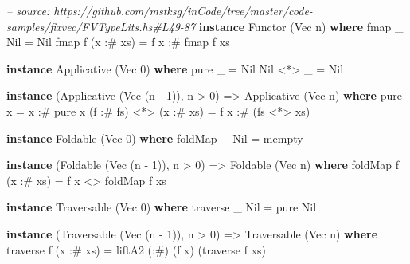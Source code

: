 \documentclass[]{article}
\newenvironment{Shaded}{}{}
\newcommand{\KeywordTok}[1]{\textcolor[rgb]{0.00,0.44,0.13}{\textbf{#1}}}
\newcommand{\DataTypeTok}[1]{\textcolor[rgb]{0.56,0.13,0.00}{#1}}
\newcommand{\DecValTok}[1]{\textcolor[rgb]{0.25,0.63,0.44}{#1}}
\newcommand{\CommentTok}[1]{\textcolor[rgb]{0.38,0.63,0.69}{\textit{#1}}}
\newcommand{\OtherTok}[1]{\textcolor[rgb]{0.00,0.44,0.13}{#1}}
\newcommand{\FunctionTok}[1]{\textcolor[rgb]{0.02,0.16,0.49}{#1}}
\newcommand{\NormalTok}[1]{#1}
\begin{document}
\begin{Shaded}
\begin{Highlighting}[]
\CommentTok{-- source: https://github.com/mstksg/inCode/tree/master/code-samples/fixvec/FVTypeLits.hs#L49-87}
\KeywordTok{instance} \DataTypeTok{Functor}\NormalTok{ (}\DataTypeTok{Vec}\NormalTok{ n) }\KeywordTok{where}
\NormalTok{    fmap _ }\DataTypeTok{Nil}       \FunctionTok{=} \DataTypeTok{Nil}
\NormalTok{    fmap f (x }\FunctionTok{:#}\NormalTok{ xs) }\FunctionTok{=}\NormalTok{ f x }\FunctionTok{:#}\NormalTok{ fmap f xs}

\KeywordTok{instance} \DataTypeTok{Applicative}\NormalTok{ (}\DataTypeTok{Vec} \DecValTok{0}\NormalTok{) }\KeywordTok{where}
\NormalTok{    pure _    }\FunctionTok{=} \DataTypeTok{Nil}
    \DataTypeTok{Nil} \FunctionTok{<*>}\NormalTok{ _ }\FunctionTok{=} \DataTypeTok{Nil}

\KeywordTok{instance}\NormalTok{ (}\DataTypeTok{Applicative}\NormalTok{ (}\DataTypeTok{Vec}\NormalTok{ (n }\FunctionTok{-} \DecValTok{1}\NormalTok{)), n }\FunctionTok{>} \DecValTok{0}\NormalTok{) }\OtherTok{=>} \DataTypeTok{Applicative}\NormalTok{ (}\DataTypeTok{Vec}\NormalTok{ n) }\KeywordTok{where}
\NormalTok{    pure x }\FunctionTok{=}\NormalTok{ x }\FunctionTok{:#}\NormalTok{ pure x}
\NormalTok{    (f }\FunctionTok{:#}\NormalTok{ fs) }\FunctionTok{<*>}\NormalTok{ (x }\FunctionTok{:#}\NormalTok{ xs) }\FunctionTok{=}\NormalTok{ f x }\FunctionTok{:#}\NormalTok{ (fs }\FunctionTok{<*>}\NormalTok{ xs)}

\KeywordTok{instance} \DataTypeTok{Foldable}\NormalTok{ (}\DataTypeTok{Vec} \DecValTok{0}\NormalTok{) }\KeywordTok{where}
\NormalTok{    foldMap _ }\DataTypeTok{Nil} \FunctionTok{=}\NormalTok{ mempty}

\KeywordTok{instance}\NormalTok{ (}\DataTypeTok{Foldable}\NormalTok{ (}\DataTypeTok{Vec}\NormalTok{ (n }\FunctionTok{-} \DecValTok{1}\NormalTok{)), n }\FunctionTok{>} \DecValTok{0}\NormalTok{) }\OtherTok{=>} \DataTypeTok{Foldable}\NormalTok{ (}\DataTypeTok{Vec}\NormalTok{ n) }\KeywordTok{where}
\NormalTok{    foldMap f (x }\FunctionTok{:#}\NormalTok{ xs) }\FunctionTok{=}\NormalTok{ f x }\FunctionTok{<>}\NormalTok{ foldMap f xs}

\KeywordTok{instance} \DataTypeTok{Traversable}\NormalTok{ (}\DataTypeTok{Vec} \DecValTok{0}\NormalTok{) }\KeywordTok{where}
\NormalTok{    traverse _ }\DataTypeTok{Nil} \FunctionTok{=}\NormalTok{ pure }\DataTypeTok{Nil}

\KeywordTok{instance}\NormalTok{ (}\DataTypeTok{Traversable}\NormalTok{ (}\DataTypeTok{Vec}\NormalTok{ (n }\FunctionTok{-} \DecValTok{1}\NormalTok{)), n }\FunctionTok{>} \DecValTok{0}\NormalTok{) }\OtherTok{=>} \DataTypeTok{Traversable}\NormalTok{ (}\DataTypeTok{Vec}\NormalTok{ n) }\KeywordTok{where}
\NormalTok{    traverse f (x }\FunctionTok{:#}\NormalTok{ xs) }\FunctionTok{=}\NormalTok{ liftA2 (}\FunctionTok{:#}\NormalTok{) (f x) (traverse f xs)}


\end{Highlighting}
\end{Shaded}
\end{document}
